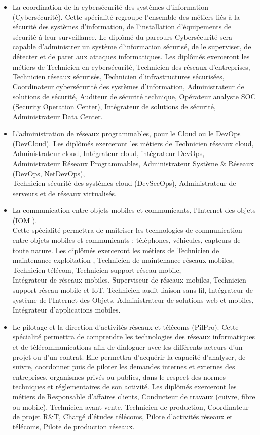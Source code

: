 \medskip
\begin{itemize}[leftmargin=5ex]
	\item La coordination de la cybersécurité des systèmes d'information (Cybersécurité). Cette spécialité regroupe l'ensemble des métiers liés à la sécurité des systèmes d'information, de l'installation d'équipements de sécurité à leur surveillance. Le diplômé du parcours Cybersécurité sera capable d'administrer un système d'information sécurisé, de le superviser, de détecter et de parer aux attaques informatiques. Les diplômés exerceront les métiers de Technicien en cybersécurité, Technicien des réseaux d'entreprises, Technicien réseaux sécurisés, Technicien d'infrastructures sécurisées, Coordinateur cybersécurité des systèmes d'infor\-mation, Administrateur de solutions de sécurité, Auditeur de sécurité technique, Opérateur analyste SOC (Security Operation Center), Intégrateur de solutions de sécurité, Administrateur Data Center.
	
	\item L'administration de réseaux programmables, pour le Cloud ou le DevOps (DevCloud). Les diplômés exerce\-ront les métiers de Technicien réseaux cloud, Administrateur cloud, Intégrateur cloud, intégrateur DevOps,\\
	Administrateur Réseaux Programmables, Administrateur Système \& Réseaux (DevOps, NetDevOps),\\
	Technicien sécurité des systèmes cloud (DevSecOps), Administrateur de serveurs et de réseaux virtualisés.
	
	\item La communication entre objets mobiles et communicants, l'Internet des objets (IOM ).\\
	Cette spécialité permettra de maîtriser les technologies de communication entre objets mobiles et communi\-cants : téléphones, véhicules, capteurs de toute nature. Les diplômés exerceront les métiers de Technicien de maintenance exploitation , Technicien de maintenance réseaux mobiles, Technicien télécom, Technicien support réseau mobile, \\
	Intégrateur de réseaux mobiles, Superviseur de réseaux mobiles, Technicien support réseau mobile et IoT, Technicien audit liaison sans fil, Intégrateur de système de l’Internet des Objets, Administrateur de solutions web et mobiles, Intégrateur d’applications mobiles.
	
	\item Le pilotage et la direction d'activités réseaux et télécoms (PilPro). Cette spécialité permettra de comprendre les technologies des réseaux informatiques et de télécommunications afin de dialoguer avec les différents acteurs d’un projet ou d’un contrat. Elle permettra d’acquérir la capacité d’analyser, de suivre, coordonner puis de piloter les demandes internes et externes des entreprises, organismes privés ou publics, dans le respect des normes techniques et réglementaires de son activité. Les diplômés exerceront les métiers de Responsable d'affaires clients, Conducteur de travaux (cuivre, fibre ou mobile), Technicien avant-vente, Technicien de production, Coordinateur de projet R\&T, Chargé d’études télécoms, Pilote d’activités réseaux et télécoms, Pilote de production réseaux.
	

\end{itemize}
